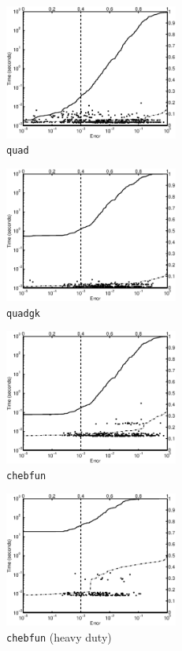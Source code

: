 \documentclass[graybox]{svmult}
\begin{document}
\begin{figure}
\centering
\begin{minipage}{5.7cm} \centering \includegraphics[width=5.7cm]{gaussiand=1quadErrTime.eps} \\ {\tt quad} \end{minipage}
\begin{minipage}{5.7cm} \centering \includegraphics[width=5.7cm]{gaussiand=1quadgkErrTime.eps} \\ {\tt quadgk} \end{minipage}
\begin{minipage}{5.7cm} \centering \includegraphics[width=5.7cm]{gaussiand=1chebfunErrTime.eps} \\ {\tt chebfun} \end{minipage}
\begin{minipage}{5.7cm} \centering \includegraphics[width=5.7cm]{gaussiand=1chebfunheavyErrTime.eps} \\ {\tt chebfun}  (heavy duty) \end{minipage}

\end{figure}
\end{document}
